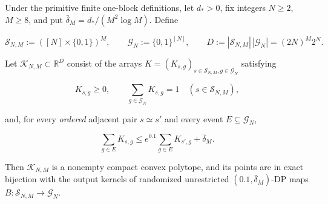 \begin{lemma}\label{lem:step-004-kernel-polytope}
Under the primitive finite one-block definitions, let \(d_*>0\), fix
integers \(N\ge2\), \(M\ge8\), and put
\(\bar\delta_M=d_*/(M^2\log M)\). Define

\[
\mathcal S_{N,M}:=([N]\times\{0,1\})^M,
\qquad
\mathcal G_N:=\{0,1\}^{[N]},
\qquad
D:=|\mathcal S_{N,M}|\,|\mathcal G_N|=(2N)^M2^N.
\]

Let \(\mathcal K_{N,M}\subset\mathbb R^D\) consist of the arrays
\(K=(K_{s,g})_{s\in\mathcal S_{N,M},g\in\mathcal G_N}\) satisfying

\[
K_{s,g}\ge0,
\qquad
\sum_{g\in\mathcal G_N}K_{s,g}=1
\quad(s\in\mathcal S_{N,M}),
\tag{6}
\]

and, for every \emph{ordered} adjacent pair \(s\simeq s'\) and every event
\(E\subseteq\mathcal G_N\),

\[
\sum_{g\in E}K_{s,g}
\le
e^{0.1}\sum_{g\in E}K_{s',g}+\bar\delta_M.
\tag{7}
\]

Then \(\mathcal K_{N,M}\) is a nonempty compact convex polytope, and its
points are in exact bijection with the output kernels of randomized
unrestricted \((0.1,\bar\delta_M)\)-DP maps
\(B:\mathcal S_{N,M}\to\mathcal G_N\).
\end{lemma}

